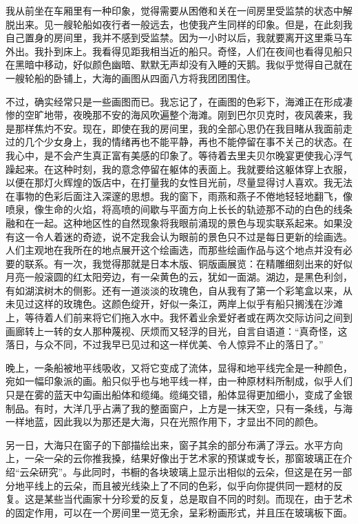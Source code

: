 \par 我从前坐在车厢里有一种印象，觉得需要从困倦和关在一间房里受监禁的状态中解脱出来。见一艘轮船如夜行者一般远去，也使我产生同样的印象。但是，在此刻我自己置身的房间里，我并不感到受监禁。因为一小时以后，我就要离开这里乘马车外出。我扑到床上。我看得见距我相当近的船只。奇怪，人们在夜间也看得见船只在黑暗中移动，好似颜色幽暗、默默无声却没有入睡的天鹅。我似乎觉得自己就在一艘轮船的卧铺上，大海的画图从四面八方将我团团围住。
\par 不过，确实经常只是一些画图而已。我忘记了，在画图的色彩下，海滩正在形成凄惨的空旷地带，夜晚那不安的海风吹遍整个海滩。刚到巴尔贝克时，夜风袭来，我是那样焦灼不安。现在，即使在我的房间里，我的全部心思仍在我目睹从我面前走过的几个少女身上，我的情绪再也不能平静，再也不能停留在事不关己的状态。在我心中，是不会产生真正富有美感的印象了。等待着去里夫贝尔晚宴更使我心浮气躁起来。在这种时刻，我的意念停留在躯体的表面上。我就要给这躯体穿上衣服，以便在那灯火辉煌的饭店中，在打量我的女性目光前，尽量显得讨人喜欢。我无法在事物的色彩后面注入深邃的思想。我的窗下，雨燕和燕子不倦地轻轻地翻飞，像喷泉，像生命的火焰，将高喷的间歇与平面方向上长长的轨迹那不动的白色的线条融和在一起。这种地区性的自然现象将我眼前涌现的景色与现实联系起来。如果没有这一令人着迷的奇迹，说不定我会认为眼前的景色只不过是每日更新的绘画选。人们主观地在我所在的地点展开这个绘画选，而那些绘画作品与这个地点并没有必要的联系。有一次，我觉得那就是日本木版、铜版画展览：在精雕细刻出来的好似月亮一般滚圆的红太阳旁边，有一朵黄色的云，犹如一面湖。湖边，是黑色利剑，有如湖滨树木的侧影。还有一道淡淡的玫瑰色，自从我有了第一个彩笔盒以来，从未见过这样的玫瑰色。这颜色绽开，好似一条江，两岸上似乎有船只搁浅在沙滩上，等待着人们前来将它们拖入水中。我怀着业余爱好者或在两次交际访问之间到画廊转上一转的女人那种蔑视、厌烦而又轻浮的目光，自言自语道：“真奇怪，这落日，与众不同，不过我早已见过和这一样优美、令人惊异不止的落日了。”
\par 晚上，一条船被地平线吸收，又将它变成了流体，显得和地平线完全是一种颜色，宛如一幅印象派的画。船只似乎也与地平线一样，由一种原材料所制成，似乎人们只是在雾的蓝天中勾画出船体和缆绳。缆绳交错，船体显得更加细小，变成了金银制品。有时，大洋几乎占满了我的整面窗户，上方是一抹天空，只有一条线，与海一样地蓝，因此我以为那还是大海，只在光照作用下，才显出不同的颜色。
\par 另一日，大海只在窗子的下部描绘出来，窗子其余的部分布满了浮云。水平方向上，一朵一朵的云你推我搡，结果好像出于艺术家的预谋或专长，那窗玻璃正在介绍“云朵研究”。与此同时，书橱的各块玻璃上显示出相似的云朵，但这是在另一部分地平线上的云朵，而且被光线染上了不同的色彩，似乎向你提供同一题材的反复。这是某些当代画家十分珍爱的反复，总是取自不同的时刻。而现在，由于艺术的固定作用，可以在一个房间里一览无余，呈彩粉画形式，并且压在玻璃板下面。

